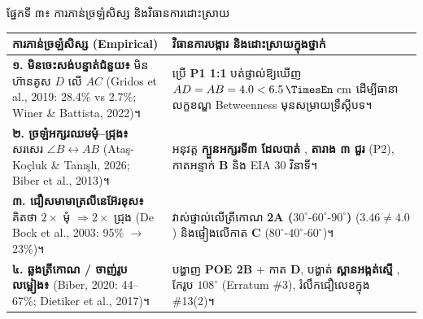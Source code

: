 \documentclass[a4paper,10pt]{article}
\renewcommand{\arraystretch}{1.14}
\newcommand{\en}[1]{{\TimesEn #1}}
\newcommand{\unit}[1]{\,\text{\en{#1}}}
\newcommand{\cnum}[1]{{\fontsize{10pt}{11.5pt}\selectfont\ding{\numexpr181+#1\relax}}}
\newcommand{\ang}[1]{\ensuremath{\angle #1}}
\begin{document}
\begin{minipage}[t]{0.51\textwidth}
{\muol ផ្នែកទី ៣៖ ការភាន់ច្រឡំសិស្ស និងវិធានការដោះស្រាយ}\\[2pt]
{\fontsize{8.3pt}{11.8pt}\selectfont\renewcommand{\arraystretch}{1.08}%
\begin{tabular}{|L{3.50cm}|L{5.60cm}|}
\hline
{}
\textbf{ការភាន់ច្រឡំសិស្ស (\en{Empirical})} & \textbf{វិធានការបង្ការ និងដោះស្រាយក្នុងថ្នាក់} \\
\hline
\textbf{១. មិនចេះសង់បន្ទាត់ជំនួយ៖} មិនហ៊ានគូស $D$ លើ $AC$ (\en{Gridos et al., 2019}: 28.4\% vs 2.7\%; \en{Winer \& Battista, 2022})។ & ប្រើ \textbf{\en{P1 1:1}} បត់ផ្ទាល់ឱ្យឃើញ $AD=AB=4.0<6.5\unit{cm}$ ដើម្បីធានាលក្ខខណ្ឌ \en{Betweenness} \cnum{4} មុនសម្រាយទ្រឹស្ដីបទ។ \\
\hline
\textbf{២. ច្រឡំអក្សរឈមមុំ--ជ្រុង៖} សរសេរ $\ang{B} \leftrightarrow AB$ (\en{Ataş-Koçluk \& Tanışlı, 2026; Biber et al., 2013})។ & អនុវត្ត \textbf{ក្បួនអក្សរទី៣ ដែលបាត់} \cnum{1}, \textbf{តារាង ៣ ជួរ} (\en{P2}), កាតអន្ទាក់ \textbf{\en{B}} និង \en{EIA} 30 វិនាទី។ \\
\hline
\textbf{៣. ជឿសមាមាត្រលីនេអ៊ែរខុស៖} គិតថា $2\times$ មុំ $\Rightarrow 2\times$ ជ្រុង (\en{De Bock et al., 2003}: 95\% $\to$ 23\%)។ & វាស់ផ្ទាល់លើត្រីកោណ \textbf{\en{2A} ($30^\circ\text{-}60^\circ\text{-}90^\circ$)} ($3.46 \neq 4.0$) និងផ្ទៀងលើកាត \textbf{\en{C}} ($80^\circ\text{-}40^\circ\text{-}60^\circ$)។ \\
\hline
\textbf{៤. ឆ្លងត្រីកោណ / ចាញ់រូបលម្អៀង៖} (\en{Biber, 2020}: 44--67\%; \en{Dietiker et al., 2017})។ & បង្ហាញ \textbf{\en{POE 2B}} + កាត \textbf{\en{D}}, បង្ហាត់ \textbf{ស្ពានអង្កត់ស្មើ \cnum{5}}, កែរូប $108^\circ$ (\en{Erratum \#3}), រំលឹកជឿលេខក្នុង \#13(2)។ \\
\hline
\end{tabular}}
\end{minipage}
\end{document}
